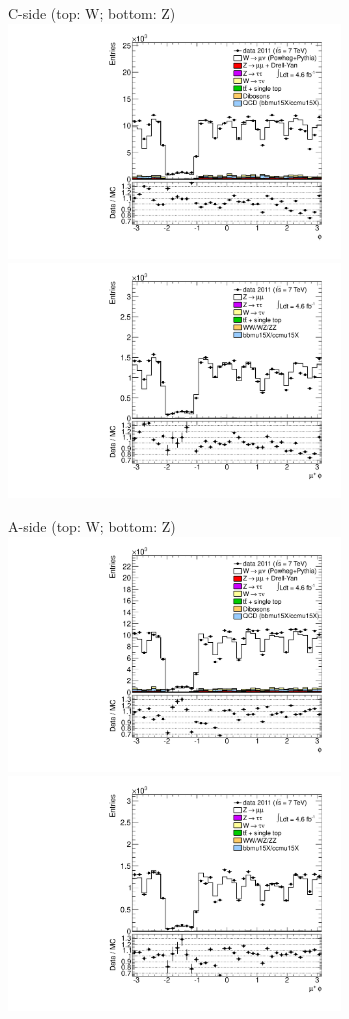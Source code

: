 {

\colb[T]

C-side (top: W; bottom: Z)
\centering
\includegraphics[width=0.66\textwidth]{dates/20130306/figures/etaphi/W_4_C_stack_l_phi_POS} \\
\includegraphics[width=0.66\textwidth]{dates/20130306/figures/etaphi/Z_4_C_stack_lP_phi_ALL.pdf}

A-side (top: W; bottom: Z)
\centering
\includegraphics[width=0.66\textwidth]{dates/20130306/figures/etaphi/W_4_A_stack_l_phi_POS} \\
\includegraphics[width=0.66\textwidth]{dates/20130306/figures/etaphi/Z_4_A_stack_lP_phi_ALL.pdf} 

\cole
}



